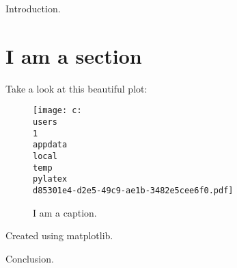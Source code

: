 \documentclass{article}
\begin{document}
Introduction.
\section{I am a section}
Take a look at this beautiful plot:


\begin{figure}[htbp]
\centering
\texttt{[image: c:\\users\\1\\appdata\\local\\temp\\pylatex\\d85301e4-d2e5-49c9-ae1b-3482e5cee6f0.pdf]}
\caption{I am a caption.}
\end{figure}


Created using matplotlib.


Conclusion.
\end{document}
